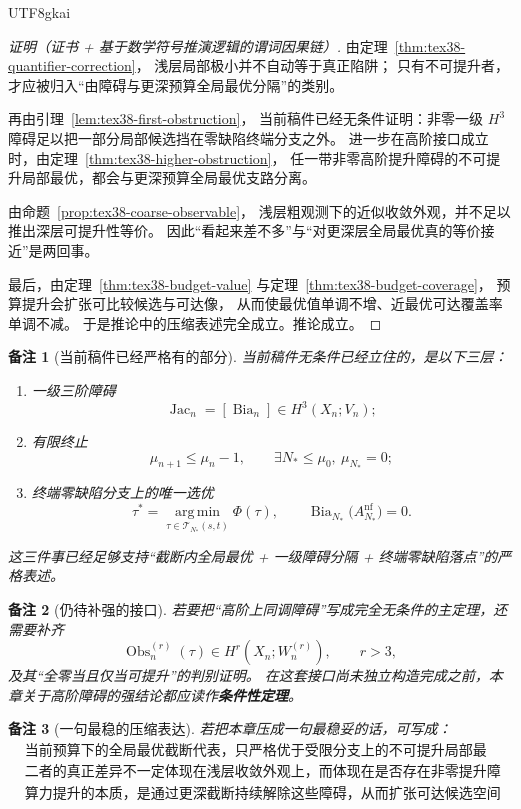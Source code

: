 \documentclass[12pt]{article}
\newtheorem{remark}{备注}[section]
\newcommand{\Bia}{\operatorname{Bia}}
\newcommand{\Jac}{\operatorname{Jac}}
\newcommand{\Obs}{\operatorname{Obs}}
\begin{document}
\begin{CJK*}{UTF8}{gkai}
\begin{proof}[证明（证书 + 基于数学符号推演逻辑的谓词因果链）]
由定理~\ref{thm:tex38-quantifier-correction}，
浅层局部极小并不自动等于真正陷阱；
只有不可提升者，才应被归入“由障碍与更深预算全局最优分隔”的类别。

再由引理~\ref{lem:tex38-first-obstruction}，
当前稿件已经无条件证明：非零一级 $H^3$ 障碍足以把一部分局部候选挡在零缺陷终端分支之外。
进一步在高阶接口成立时，由定理~\ref{thm:tex38-higher-obstruction}，
任一带非零高阶提升障碍的不可提升局部最优，都会与更深预算全局最优支路分离。

由命题~\ref{prop:tex38-coarse-observable}，
浅层粗观测下的近似收敛外观，并不足以推出深层可提升性等价。
因此“看起来差不多”与“对更深层全局最优真的等价接近”是两回事。

最后，由定理~\ref{thm:tex38-budget-value} 与定理~\ref{thm:tex38-budget-coverage}，
预算提升会扩张可比较候选与可达像，
从而使最优值单调不增、近最优可达覆盖率单调不减。
于是推论中的压缩表述完全成立。推论成立。
\end{proof}

\begin{remark}[当前稿件已经严格有的部分]
当前稿件无条件已经立住的，是以下三层：
\begin{enumerate}
  \item 一级三阶障碍
  \[
    \Jac_n=[\Bia_n]\in H^3(X_n;V_n);
  \]
  \item 有限终止
  \[
    \mu_{n+1}\le\mu_n-1,
    \qquad
    \exists N_\ast\le\mu_0,\ \mu_{N_\ast}=0;
  \]
  \item 终端零缺陷分支上的唯一选优
  \[
    \tau^\ast
    =
    \operatorname*{arg\,min}_{\tau\in\mathcal T_{N_\ast}(s,t)}\Phi(\tau),
    \qquad
    \Bia_{N_\ast}\bigl(A_{N_\ast}^{\mathrm{nf}}\bigr)=0.
  \]
\end{enumerate}
这三件事已经足够支持“截断内全局最优 + 一级障碍分隔 + 终端零缺陷落点”的严格表述。
\end{remark}

\begin{remark}[仍待补强的接口]
若要把“高阶上同调障碍”写成完全无条件的主定理，还需要补齐
\[
  \Obs^{(r)}_n(\tau)\in H^r(X_n;W_n^{(r)}),
  \qquad
  r>3,
\]
及其“全零当且仅当可提升”的判别证明。
在这套接口尚未独立构造完成之前，本章关于高阶障碍的强结论都应读作\textbf{条件性定理}。
\end{remark}

\begin{remark}[一句最稳的压缩表达]
若把本章压成一句最稳妥的话，可写成：
\[
  \begin{aligned}
    &\text{当前预算下的全局最优截断代表，只严格优于受限分支上的不可提升局部最优；}\\
    &\text{二者的真正差异不一定体现在浅层收敛外观上，而体现在是否存在非零提升障碍类；}\\
    &\text{算力提升的本质，是通过更深截断持续解除这些障碍，从而扩张可达候选空间并改善逼近。}
  \end{aligned}
\]
\end{remark}


\end{CJK*}
\end{document}
